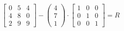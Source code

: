 \documentclass[10pt]{article}
\begin{document}
\begin{equation*}
\begin{bmatrix}
0 & 5 & 4 \\
4 & 8 & 0 \\
2 & 9 & 9 
\end{bmatrix}-
\begin{pmatrix}
4 \\
7 \\
1 
\end{pmatrix}\cdot
\begin{bmatrix}
1 & 0 & 0 \\
0 & 1 & 0 \\
0 & 0 & 1 
\end{bmatrix}=R
\end{equation*}
\end{document}

